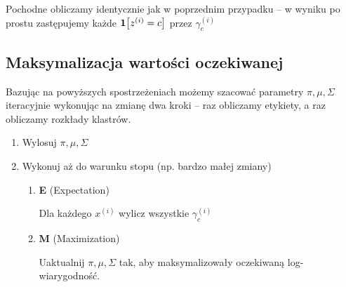 Pochodne obliczamy identycznie jak w poprzednim przypadku -- w wyniku po prostu zastępujemy każde \( \indicator{z^{(i)} = c} \) przez \( \gamma^{(i)}_c \)

\subsection{Maksymalizacja wartości oczekiwanej}

Bazując na powyższych spostrzeżeniach możemy szacować parametry \( \pi, \mu, \Sigma \) iteracyjnie wykonując na zmianę dwa kroki -- raz obliczamy etykiety, a raz obliczamy rozkłady klastrów.

\begin{enumerate}
    \item Wylosuj \( \pi, \mu, \Sigma \)
    \item Wykonuj aż do warunku stopu (np. bardzo małej zmiany)
    \begin{enumerate}
        \item \textbf{E} (Expectation)
        
        Dla każdego \( x^{(i)} \)  wylicz wszystkie \( \gamma^{(i)}_c \)
        
        \item \textbf{M} (Maximization)
        
        Uaktualnij \( \pi, \mu, \Sigma \) tak, aby maksymalizowały oczekiwaną log-wiarygodność.
    \end{enumerate}
\end{enumerate}